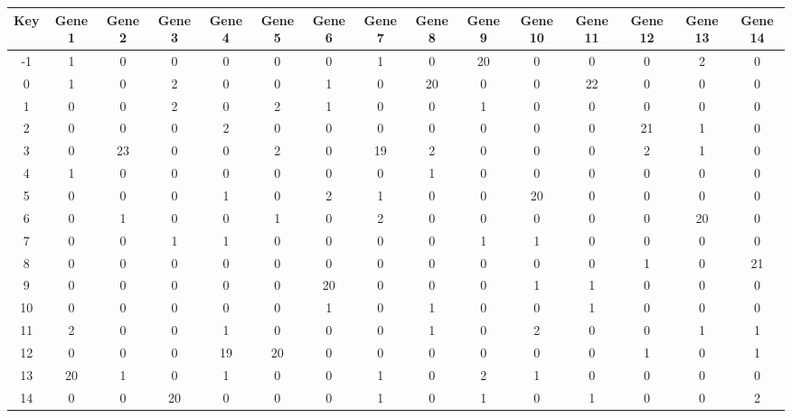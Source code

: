 \begin{tabular}{|c|c|c|c|c|c|c|c|c|c|c|c|c|c|c|}
\hline
Key & Gene 1 & Gene 2 & Gene 3 & Gene 4 & Gene 5 & Gene 6 & Gene 7 & Gene 8 & Gene 9 & Gene 10 & Gene 11 & Gene 12 & Gene 13 & Gene 14 \\
\hline
-1 & 1 & 0 & 0 & 0 & 0 & 0 & 1 & 0 & 20 & 0 & 0 & 0 & 2 & 0 \\
0 & 1 & 0 & 2 & 0 & 0 & 1 & 0 & 20 & 0 & 0 & 22 & 0 & 0 & 0 \\
1 & 0 & 0 & 2 & 0 & 2 & 1 & 0 & 0 & 1 & 0 & 0 & 0 & 0 & 0 \\
2 & 0 & 0 & 0 & 2 & 0 & 0 & 0 & 0 & 0 & 0 & 0 & 21 & 1 & 0 \\
3 & 0 & 23 & 0 & 0 & 2 & 0 & 19 & 2 & 0 & 0 & 0 & 2 & 1 & 0 \\
4 & 1 & 0 & 0 & 0 & 0 & 0 & 0 & 1 & 0 & 0 & 0 & 0 & 0 & 0 \\
5 & 0 & 0 & 0 & 1 & 0 & 2 & 1 & 0 & 0 & 20 & 0 & 0 & 0 & 0 \\
6 & 0 & 1 & 0 & 0 & 1 & 0 & 2 & 0 & 0 & 0 & 0 & 0 & 20 & 0 \\
7 & 0 & 0 & 1 & 1 & 0 & 0 & 0 & 0 & 1 & 1 & 0 & 0 & 0 & 0 \\
8 & 0 & 0 & 0 & 0 & 0 & 0 & 0 & 0 & 0 & 0 & 0 & 1 & 0 & 21 \\
9 & 0 & 0 & 0 & 0 & 0 & 20 & 0 & 0 & 0 & 1 & 1 & 0 & 0 & 0 \\
10 & 0 & 0 & 0 & 0 & 0 & 1 & 0 & 1 & 0 & 0 & 1 & 0 & 0 & 0 \\
11 & 2 & 0 & 0 & 1 & 0 & 0 & 0 & 1 & 0 & 2 & 0 & 0 & 1 & 1 \\
12 & 0 & 0 & 0 & 19 & 20 & 0 & 0 & 0 & 0 & 0 & 0 & 1 & 0 & 1 \\
13 & 20 & 1 & 0 & 1 & 0 & 0 & 1 & 0 & 2 & 1 & 0 & 0 & 0 & 0 \\
14 & 0 & 0 & 20 & 0 & 0 & 0 & 1 & 0 & 1 & 0 & 1 & 0 & 0 & 2 \\
\hline
\end{tabular}